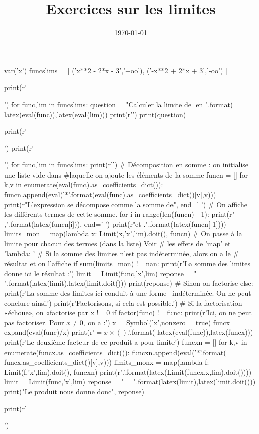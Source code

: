 \documentclass[a4paper,12pt,french]{article}
\title{Exercices sur les limites}
\date{\today}
\begin{document}
\maketitle

\begin{sympyblock}
  var('x')
  funcslims = [
  ('x**2 - 2*x - 3','+oo'),
  ('-x**2 + 2*x + 3','-oo')
  ]

  print(r'\begin{Exercise}[number=1,title={Vrai-faux}]')
  for func,lim in funcslims:
      question = "Calculer la limite de ${}$ en ${}$".format(
      latex(eval(func)),latex(eval(lim)))
      print(r'\Question')
      print(question)

  print(r'\end{Exercise}')
  print(r'\begin{Answer}')
  for func,lim in funcslims:
      print(r'\Question')
      # Décomposition en somme : on initialise une liste vide dans
      #laquelle on ajoute les éléments de la somme
      funcn = []
      for k,v in enumerate(eval(func).as_coefficients_dict()):
          funcn.append(eval('{}*{}'.format(eval(func).as_coefficients_dict()[v],v)))
      print(r"L'expression se décompose comme la somme de", end=' ')
      # On affiche les différents termes de cette somme.
      for i in range(len(funcn) - 1):
          print(r"${}$,".format(latex(funcn[i])), end=' ')
          print(r"et ${}$.".format(latex(funcn[-1])))
      limits_mon =  map(lambda x: Limit(x,'x',lim).doit(), funcn)
      # On passe à la limite pour chacun des termes (dans la liste) Voir
      # les effets de 'map' et 'lambda: '
      # Si la somme des limites n'est pas indéterminée, alors on a le
      # résultat et on l'affiche
      if sum(limits_mon) != nan:
          print(r'La somme des limites donne ici le résultat :')
          limit = Limit(func,'x',lim)
          reponse = "${} = {}$".format(latex(limit),latex(limit.doit()))
          print(reponse)
      # Sinon on factorise
      else:
          print(r'La somme des limites ici conduit à une forme \
          indéterminée. On ne peut conclure ainsi.')
          print(r'Factorisons, si cela est possible.')
          # Si la factorisation «échoue», on «factorise par x != 0
          if factor(func) != func:
              print(r'Ici, on ne peut pas factoriser. Pour $x\neq 0$, on a :')
              x = Symbol('x',nonzero = true)
              funcx = expand(eval(func)/x)
              print(r'${} = x\times\left({}\right)$.'.format(
              latex(eval(func)),latex(funcx)))
              print(r'Le deuxième facteur de ce produit a pour limite')
              funcxn = []
              for k,v in enumerate(funcx.as_coefficients_dict()):
                  funcxn.append(eval('{}*{}'.format(
                  funcx.as_coefficients_dict()[v],v)))
              limits_monx =  map(lambda f: Limit(f,'x',lim).doit(), funcxn)
              print(r'${}$.'.format(latex(Limit(funcx,x,lim).doit())))
              limit = Limit(func,'x',lim)
              reponse = "${} = {}$".format(latex(limit),latex(limit.doit()))
              print("Le produit nous donne donc", reponse)

  print(r'\end{Answer}')
\end{sympyblock}

\pagebreak
\shipoutAnswer
\end{document}
